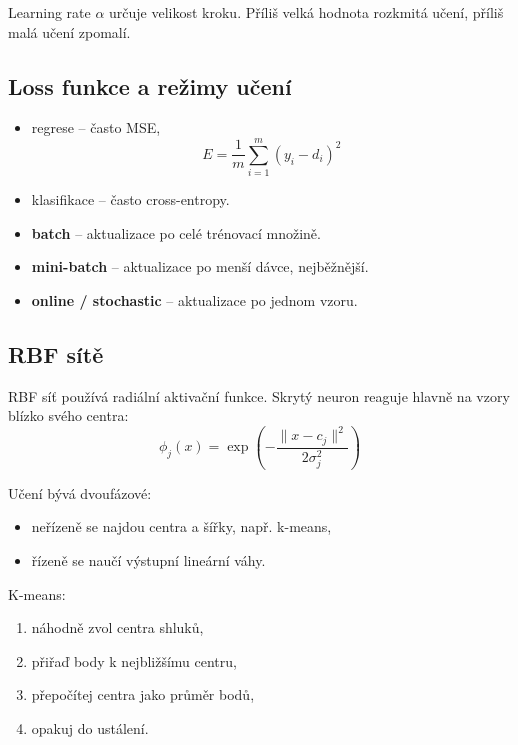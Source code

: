 Learning rate \(\alpha\) určuje velikost kroku. Příliš velká hodnota rozkmitá
učení, příliš malá učení zpomalí.

\subsection*{Loss funkce a režimy učení}
\begin{itemize}
    \item regrese -- často MSE,
          \begin{equation}
              E=\frac{1}{m}\sum_{i=1}^{m}(y_i-d_i)^2
          \end{equation}
    \item klasifikace -- často cross-entropy.
\end{itemize}

\begin{itemize}
    \item \textbf{batch} -- aktualizace po celé trénovací množině.
    \item \textbf{mini-batch} -- aktualizace po menší dávce, nejběžnější.
    \item \textbf{online / stochastic} -- aktualizace po jednom vzoru.
\end{itemize}

\subsection*{RBF sítě}
RBF síť používá radiální aktivační funkce. Skrytý neuron reaguje hlavně na
vzory blízko svého centra:
\begin{equation}
    \phi_j(x)=\exp\left(-\frac{\|x-c_j\|^2}{2\sigma_j^2}\right)
\end{equation}

Učení bývá dvoufázové:
\begin{itemize}
    \item neřízeně se najdou centra a šířky, např. k-means,
    \item řízeně se naučí výstupní lineární váhy.
\end{itemize}

K-means:
\begin{enumerate}
    \item náhodně zvol centra shluků,
    \item přiřaď body k nejbližšímu centru,
    \item přepočítej centra jako průměr bodů,
    \item opakuj do ustálení.
\end{enumerate}

